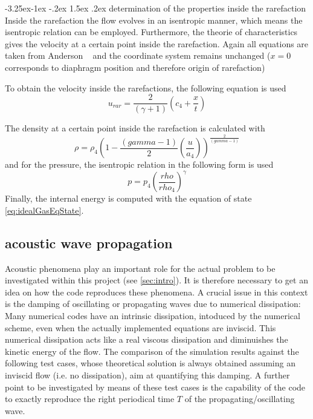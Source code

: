 \documentclass{report}
\makeatletter
\renewcommand\paragraph{\@startsection{paragraph}{4}{\z@}%
  {-3.25ex\@plus -1ex \@minus -.2ex}%
  {1.5ex \@plus .2ex}%
  {\normalfont\normalsize\bfseries}}
\makeatother
\begin{document}
\paragraph{determination of the properties inside the rarefaction}
Inside the rarefaction the flow evolves in an isentropic manner, which means the isentropic relation can be employed. Furthermore, the theorie of characteristics gives the velocity at a certain point inside the rarefaction. Again all equations are taken from Anderson ~\cite{Anderson2002} and the coordinate system remains unchanged ($x=0$ corresponds to diaphragm position and therefore origin of rarefaction)

To obtain the velocity inside the rarefactions, the following equation is used
\begin{equation}
 u_{rar}=\frac{2}{(\gamma+1)}(c_4+\frac{x}{t})
\end{equation}

The density at a certain point inside the rarefaction is calculated with
\begin{equation}
\rho=\rho_4 (1-\frac{(gamma-1)}{2}(\frac{u}{a_4}))^\frac{2}{(gamma-1)}
\end{equation}
and for the pressure, the isentropic relation in the following form is used
\begin{equation}
p=p_4(\frac{rho}{rho_4})^\gamma
\end{equation}
Finally, the internal energy is computed with the equation of state \ref{eq:idealGasEqState}.

\subsection{acoustic wave propagation}
Acoustic phenomena play an important role for the actual problem to be investigated within this project (see \ref{sec:intro}). It is therefore necessary to get an idea on how the code reproduces these phenomena. A crucial issue in this context is the damping of oscillating or propagating waves due to numerical dissipation: Many numerical codes have an intrinsic dissipation, intoduced by the numerical scheme, even when the actually implemented equations are inviscid. This numerical dissipation acts like a real viscous dissipation and diminuishes the kinetic energy of the flow. The comparison of the simulation results against the following test cases, whose theoretical solution is always obtained assuming an inviscid flow (i.e. no dissipation), aim at quantifying this damping. A further point to be investigated by means of these test cases is the capability of the code to exactly reproduce the right periodical time $T$ of the propagating/oscillating wave.
\end{document}
